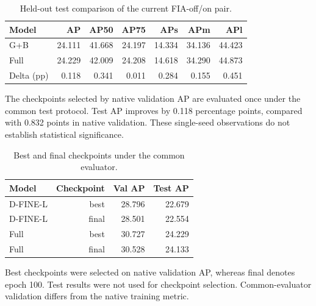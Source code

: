 \begin{table}[t]
\centering
\small
\setlength{\tabcolsep}{4pt}
\caption{Held-out test comparison of the current FIA-off/on pair.}
\label{tab:selected-s1}
\begin{tabular}{lrrrrrr}
\toprule
Model & AP & AP50 & AP75 & APs & APm & APl \\
\midrule
G+B & 24.111 & 41.668 & 24.197 & 14.334 & 34.136 & 44.423 \\
Full & 24.229 & 42.009 & 24.208 & 14.618 & 34.290 & 44.873 \\
Delta (pp) & 0.118 & 0.341 & 0.011 & 0.284 & 0.155 & 0.451 \\
\bottomrule
\end{tabular}
\par\smallskip
\begin{minipage}{0.97\textwidth}\footnotesize The checkpoints selected by native validation AP are evaluated once under the common test protocol. Test AP improves by 0.118 percentage points, compared with 0.832 points in native validation. These single-seed observations do not establish statistical significance.\end{minipage}
\par\medskip
\end{table}

\begin{table}[t]
\centering
\small
\setlength{\tabcolsep}{4pt}
\caption{Best and final checkpoints under the common evaluator.}
\label{tab:selected-s2}
\begin{tabular}{lrrr}
\toprule
Model & Checkpoint & Val AP & Test AP \\
\midrule
D-FINE-L & best & 28.796 & 22.679 \\
D-FINE-L & final & 28.501 & 22.554 \\
Full & best & 30.727 & 24.229 \\
Full & final & 30.528 & 24.133 \\
\bottomrule
\end{tabular}
\par\smallskip
\begin{minipage}{0.97\textwidth}\footnotesize Best checkpoints were selected on native validation AP, whereas final denotes epoch 100. Test results were not used for checkpoint selection. Common-evaluator validation differs from the native training metric.\end{minipage}
\par\medskip
\end{table}

